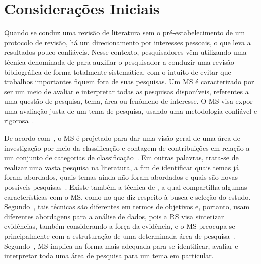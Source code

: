 \section{Considerações Iniciais}

Quando se conduz uma revisão de literatura sem o pré-estabelecimento de um protocolo de revisão, há um direcionamento por interesses pessoais, o que leva a resultados pouco confiáveis. Nesse contexto, pesquisadores vêm utilizando uma técnica denominada de  para auxiliar o pesquisador a conduzir uma revisão bibliográfica de forma totalmente sistemática, com o intuito de evitar que trabalhos importantes fiquem fora de suas pesquisas. Um MS é caracterizado por ser um meio de avaliar e interpretar todas as pesquisas disponíveis, referentes a uma questão de pesquisa, tema, área ou fenômeno de interesse. O MS visa expor uma avaliação justa de um tema de pesquisa, usando uma metodologia confiável e rigorosa~\cite{Petersen_2008, Kitchenham_2010, Petersen_20151}.


De acordo com~, o MS é projetado para dar uma visão geral de uma área de investigação por meio da classificação e contagem de contribuições em relação a um conjunto de categorias de classificação~\cite{Petersen_2008, Kitchenham_2010}. Em outras palavras, trata-se de realizar uma vasta pesquisa na literatura, a fim de identificar quais temas já foram abordados, quais temas ainda não foram abordados e quais são novas possíveis pesquisas~\cite{Kitchenham_2010}. Existe também a técnica de , a qual compartilha algumas características com o MS, como no que diz respeito à busca e seleção do estudo. Segundo~, tais técnicas são diferentes em termos de objetivos e, portanto, usam diferentes abordagens para a análise de dados, pois a RS visa sintetizar evidências, também considerando a força da evidência, e o MS preocupa-se principalmente com a estruturação de uma determinada área de pesquisa~\cite{Petersen_20151}. Segundo~, MS implica na forma mais adequada para se identificar, avaliar e interpretar toda uma área de pesquisa para um tema em particular. 

